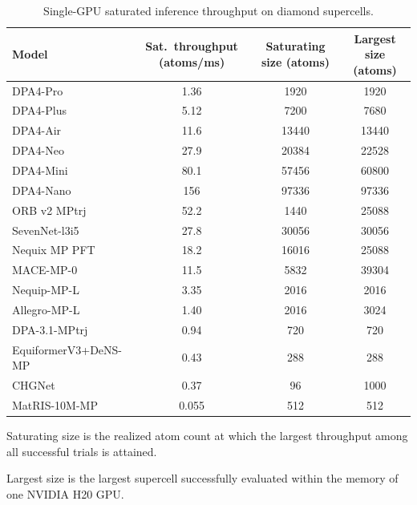 \begin{table}[ht]
    \PaperTableStyle
    \begin{threeparttable}
        \caption{Single-GPU saturated inference throughput on diamond supercells.}
        \label{tab:sm_saturated_throughput}
        \begin{tabular*}{\linewidth}{@{\extracolsep{\fill}}lccc@{}}
        \toprule
        \textbf{Model} &
        {\textbf{Sat.\ throughput (atoms/ms)}} &
        {\textbf{Saturating size (atoms)}\tnote{a}} &
        {\textbf{Largest size (atoms)}\tnote{b}} \\
        \midrule
        DPA4-Pro             & \num{1.36}  & \num{1920}  & \num{1920}  \\
        DPA4-Plus            & \num{5.12}  & \num{7200}  & \num{7680}  \\
        DPA4-Air             & \num{11.6}  & \num{13440} & \num{13440} \\
        DPA4-Neo             & \num{27.9}  & \num{20384} & \num{22528} \\
        DPA4-Mini            & \num{80.1}  & \num{57456} & \num{60800} \\
        DPA4-Nano            & \num{156}   & \num{97336} & \num{97336} \\
        \midrule
        ORB v2 MPtrj         & \num{52.2}  & \num{1440}  & \num{25088} \\
        SevenNet-l3i5        & \num{27.8}  & \num{30056} & \num{30056} \\
        Nequix MP PFT        & \num{18.2}  & \num{16016} & \num{25088} \\
        MACE-MP-0            & \num{11.5}  & \num{5832}  & \num{39304} \\
        Nequip-MP-L          & \num{3.35}  & \num{2016}  & \num{2016}  \\
        Allegro-MP-L         & \num{1.40}  & \num{2016}  & \num{3024}  \\
        DPA-3.1-MPtrj        & \num{0.94}  & \num{720}   & \num{720}   \\
        EquiformerV3+DeNS-MP & \num{0.43}  & \num{288}   & \num{288}   \\
        CHGNet               & \num{0.37}  & \num{96}    & \num{1000}  \\
        MatRIS-10M-MP        & \num{0.055} & \num{512}   & \num{512}   \\
        \bottomrule
        \end{tabular*}
        \begin{tablenotes}[flushleft]
            \PaperTableNotesStyle
            \item[a] Saturating size is the realized atom count at which the largest throughput among all successful trials is attained.
            \item[b] Largest size is the largest supercell successfully evaluated within the memory of one NVIDIA H20 GPU.
        \end{tablenotes}
    \end{threeparttable}
\end{table}

